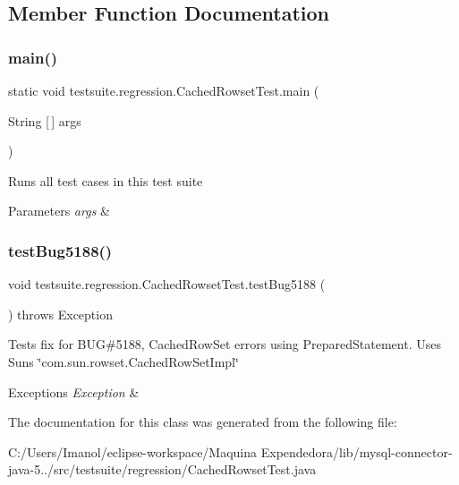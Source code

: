 \subsection{Member Function Documentation}
\mbox{\label{classtestsuite_1_1regression_1_1_cached_rowset_test_a66de4a98e7241932f80981d0efa979be}} 
\subsubsection{\texorpdfstring{main()}{main()}}
{\footnotesize\ttfamily static void testsuite.\+regression.\+Cached\+Rowset\+Test.\+main (\begin{DoxyParamCaption}\item[{String \mbox{[}$\,$\mbox{]}}]{args }\end{DoxyParamCaption})\hspace{0.3cm}{\ttfamily [static]}}

Runs all test cases in this test suite


\begin{DoxyParams}{Parameters}
{\em args} & \\
\hline
\end{DoxyParams}
\mbox{\label{classtestsuite_1_1regression_1_1_cached_rowset_test_a463f914f431e564bd1e4fe42de779037}} 
\subsubsection{\texorpdfstring{test\+Bug5188()}{testBug5188()}}
{\footnotesize\ttfamily void testsuite.\+regression.\+Cached\+Rowset\+Test.\+test\+Bug5188 (\begin{DoxyParamCaption}{ }\end{DoxyParamCaption}) throws Exception}

Tests fix for B\+UG\#5188, Cached\+Row\+Set errors using Prepared\+Statement. Uses Sun\textquotesingle{}s \char`\"{}com.\+sun.\+rowset.\+Cached\+Row\+Set\+Impl\char`\"{}


\begin{DoxyExceptions}{Exceptions}
{\em Exception} & \\
\hline
\end{DoxyExceptions}


The documentation for this class was generated from the following file\+:\begin{DoxyCompactItemize}
\item 
C\+:/\+Users/\+Imanol/eclipse-\/workspace/\+Maquina Expendedora/lib/mysql-\/connector-\/java-\/5../src/testsuite/regression/Cached\+Rowset\+Test.\+java\end{DoxyCompactItemize}
